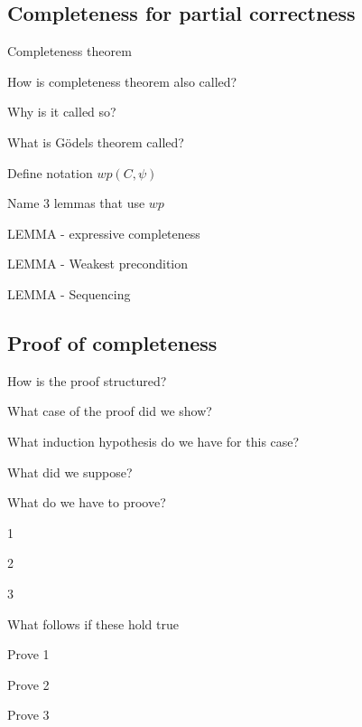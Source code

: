 \documentclass[fleqn]{article}
\begin{document}
\subsection{Completeness for partial correctness}
\begin{enumerate}
    {\color{red}\item Completeness theorem}
    \item How is completeness theorem also called?
    {\color{blue}\item Why is it called so?}
    {\color{red}\item What is Gödels theorem called?}
    {\color{blue}\item Define notation $wp(C, \psi)$}
    {\color{red}\item Name 3 lemmas that use $wp$}
    {\color{blue}\item LEMMA - expressive completeness}
    {\color{green}\item LEMMA - Weakest precondition}
    {\color{blue}\item LEMMA - Sequencing}
\end{enumerate}

\subsection{Proof of completeness}
\begin{enumerate}
    {\color{blue}\item How is the proof structured?}
    \item What case of the proof did we show?
    {\color{red}\item What induction hypothesis do we have for this case?}
    {\color{red}\item What did we suppose?}
    \item What do we have to proove?
    \begin{itemize}
        {\color{blue}\item 1}
        {\color{blue}\item 2}
        {\color{blue}\item 3}
    \end{itemize}
    {\color{blue}\item What follows if these hold true}
    {\color{blue}\item Prove 1}
    {\color{red}\item Prove 2}
    {\color{blue}\item Prove 3}
\end{enumerate}
\end{document}
